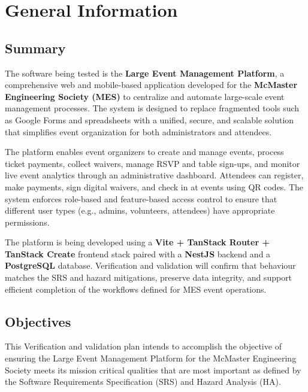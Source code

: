 \documentclass[12pt, titlepage]{article}
\begin{document}
\newpage




\section{General Information}

\subsection{Summary}

The software being tested is the \textbf{Large Event Management Platform}, a comprehensive web and mobile-based application developed for the \textbf{McMaster Engineering Society (MES)} to centralize and automate large-scale event management processes. The system is designed to replace fragmented tools such as Google Forms and spreadsheets with a unified, secure, and scalable solution that simplifies event organization for both administrators and attendees.

The platform enables event organizers to create and manage events, process ticket payments, collect waivers, manage RSVP and table sign-ups, and monitor live event analytics through an administrative dashboard. Attendees can register, make payments, sign digital waivers, and check in at events using QR codes. The system enforces role-based and feature-based access control to ensure that different user types (e.g., admins, volunteers, attendees) have appropriate permissions.

The platform is being developed using a \textbf{Vite + TanStack Router + TanStack Create} frontend stack paired with a \textbf{NestJS} backend and a \textbf{PostgreSQL} database. Verification and validation will confirm that behaviour matches the SRS and hazard mitigations, preserve data integrity, and support efficient completion of the workflows defined for MES event operations.

\subsection{Objectives}
This Verification and validation plan intends to accomplish the objective of ensuring the Large Event Management Platform for the McMaster Engineering Society meets its mission critical qualities that are most important as defined by the Software Requirements Specification (SRS) and Hazard Analysis (HA).
\end{document}
